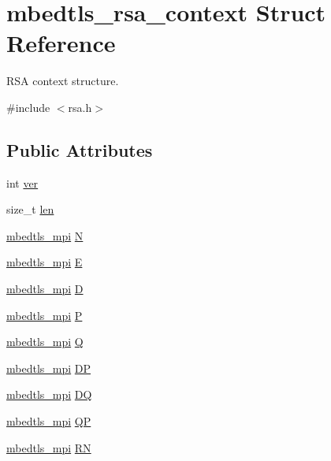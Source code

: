 \hypertarget{structmbedtls__rsa__context}{\section{mbedtls\-\_\-rsa\-\_\-context Struct Reference}
\label{structmbedtls__rsa__context}
}


R\-S\-A context structure.  




{\ttfamily \#include $<$rsa.\-h$>$}

\subsection*{Public Attributes}
\begin{DoxyCompactItemize}
\item 
int \hyperlink{structmbedtls__rsa__context_a3b8683697a6f69c92860e078c934a4d9}{ver}
\item 
size\-\_\-t \hyperlink{structmbedtls__rsa__context_a06a537fe6045d6c08d92b2a91461b5d8}{len}
\item 
\hyperlink{structmbedtls__mpi}{mbedtls\-\_\-mpi} \hyperlink{structmbedtls__rsa__context_a359cae81bccf5cfd2f37f98d1b790707}{N}
\item 
\hyperlink{structmbedtls__mpi}{mbedtls\-\_\-mpi} \hyperlink{structmbedtls__rsa__context_a7694251c9d4d80f4fe65831be46b0c50}{E}
\item 
\hyperlink{structmbedtls__mpi}{mbedtls\-\_\-mpi} \hyperlink{structmbedtls__rsa__context_ad9552371239922dd67d146b937d1aada}{D}
\item 
\hyperlink{structmbedtls__mpi}{mbedtls\-\_\-mpi} \hyperlink{structmbedtls__rsa__context_abb8c0a5e2c22d617ff2fc3b2a81ab53c}{P}
\item 
\hyperlink{structmbedtls__mpi}{mbedtls\-\_\-mpi} \hyperlink{structmbedtls__rsa__context_a72efb64a1c63318ced5869e570c7cce3}{Q}
\item 
\hyperlink{structmbedtls__mpi}{mbedtls\-\_\-mpi} \hyperlink{structmbedtls__rsa__context_aa46b066a4cf04deb4e627e69e6b036e8}{D\-P}
\item 
\hyperlink{structmbedtls__mpi}{mbedtls\-\_\-mpi} \hyperlink{structmbedtls__rsa__context_a753b59e552469b6abb6fad9853a2042d}{D\-Q}
\item 
\hyperlink{structmbedtls__mpi}{mbedtls\-\_\-mpi} \hyperlink{structmbedtls__rsa__context_a76dad2612cdce4bc90933d317d3adc92}{Q\-P}
\item 
\hyperlink{structmbedtls__mpi}{mbedtls\-\_\-mpi} \hyperlink{structmbedtls__rsa__context_a6e8530ea71b28336cbebd77219757271}{R\-N}

\end{DoxyCompactItemize}

